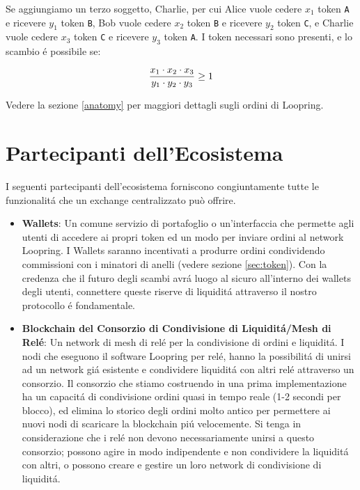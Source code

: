 \documentclass[UTF8,nofonts]{article}
\begin{document}
\begin{multicols}{2}
Se aggiungiamo un terzo soggetto, Charlie, per cui Alice vuole cedere $x_1$ token \verb|A| e ricevere $y_1$ token \verb|B|, Bob vuole cedere $x_2$ token \verb|B| e ricevere $y_2$ token \verb|C|, e Charlie vuole cedere $x_3$ token \verb|C| e ricevere $y_3$ token \verb|A|.  I token necessari sono presenti, e lo scambio \'e possibile se:

\begin{equation}
{{x_1 \cdot x_2 \cdot x_3 \over y_1 \cdot y_2 \cdot y_3} \geq 1}
\end{equation}


Vedere la sezione \ref{anatomy} per maggiori dettagli sugli ordini di Loopring.



\section{Partecipanti dell'Ecosistema\label{sec:ecosystem}}
I seguenti partecipanti dell'ecosistema forniscono congiuntamente tutte le funzionalit\'a che un exchange centralizzato può offrire.

\begin{itemize}

\item \textbf{Wallets}: Un comune servizio di portafoglio o un'interfaccia che permette agli utenti di accedere ai propri token ed un modo per inviare ordini al network Loopring. I Wallets saranno incentivati a produrre ordini condividendo commissioni con i minatori di anelli  (vedere sezione \ref{sec:token}). Con la credenza che il futuro degli scambi avr\'a luogo al sicuro all'interno dei wallets degli utenti, connettere queste riserve di liquidit\'a attraverso il nostro protocollo \'e fondamentale.

\item \textbf{Blockchain del Consorzio di Condivisione di Liquidit\'a/Mesh di Rel\'e}: Un network di mesh di rel\'e per la condivisione di ordini e liquidit\'a.  I nodi che eseguono il software Loopring per rel\'e, hanno la possibilit\'a di unirsi ad un network gi\'a esistente e condividere liquidit\'a con altri rel\'e attraverso un consorzio. Il consorzio che stiamo costruendo in una prima implementazione ha un capacit\'a di condivisione ordini quasi in tempo reale (1-2 secondi per blocco), ed elimina lo storico degli ordini molto antico per permettere ai nuovi nodi di scaricare la blockchain pi\'u velocemente.
Si tenga in considerazione che i rel\'e non devono necessariamente unirsi a questo consorzio; possono agire in modo indipendente e non condividere la liquidit\'a con altri, o possono creare e gestire un loro network di condivisione di liquidit\'a.


\end{itemize}
\end{multicols}
\end{document}
